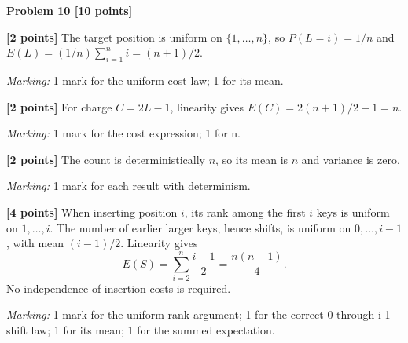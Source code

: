 \documentclass[12pt,letterpaper]{article}
\newcommand{\problemheading}[2][5\baselineskip]{\Needspace{#1}\par\noindent\hspace*{-0.625in}\textbf{#2}\par\nobreak\vspace{0.3em}}
\begin{document}
\vspace{0.65em}
\problemheading[\dimexpr 3\baselineskip+4\baselineskip\relax]{Problem 10 [10 points]}
\begin{description}[font=\normalfont,leftmargin=1.2em,labelsep=0.4em]
\item[(a)] \textbf{[2 points]} The target position is uniform on $\{1,\ldots,n\}$, so $P(L=i)=1/n$ and $E(L)=(1/n)\sum_{i=1}^ni=(n+1)/2$.
\par\textit{Marking:} 1 mark for the uniform cost law; 1 for its mean.
\item[(b)] \textbf{[2 points]} For charge $C=2L-1$, linearity gives $E(C)=2(n+1)/2-1=n$.
\par\textit{Marking:} 1 mark for the cost expression; 1 for n.
\item[(c)] \textbf{[2 points]} The count is deterministically $n$, so its mean is $n$ and variance is zero.
\par\textit{Marking:} 1 mark for each result with determinism.
\item[(d)] \textbf{[4 points]} When inserting position $i$, its rank among the first $i$ keys is uniform on $1,\ldots,i$. The number of earlier larger keys, hence shifts, is uniform on $0,\ldots,i-1$, with mean $(i-1)/2$. Linearity gives\[E(S)=\sum_{i=2}^n\frac{i-1}{2}=\frac{n(n-1)}4.\]No independence of insertion costs is required.
\par\textit{Marking:} 1 mark for the uniform rank argument; 1 for the correct 0 through i-1 shift law; 1 for its mean; 1 for the summed expectation.
\end{description}
\end{document}
